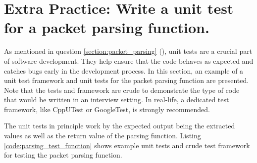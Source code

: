 \documentclass[main.tex]{subfiles}
\begin{document}
\section{Extra Practice: Write a unit test for a packet parsing function.} \label{extra_practice:packet_parsing_tests}

\spoilerline

\noindent As mentioned in question \ref{section:packet_parsing} (\textit{}), unit tests are a crucial part of software development. They help ensure that the code behaves as expected and catches bugs early in the development process. In this section, an example of a unit test framework and unit tests for the packet parsing function are presented. Note that the tests and framework are crude to demonstrate the type of code that would be written in an interview setting. In real-life, a dedicated test framework, like CppUTest or GoogleTest, is strongly recommended. \newline

\newnoindentpara The unit tests in principle work by the expected output being the extracted values as well as the return value of the parsing function. Listing \ref{code:parsing_test_function} shows example unit tests and crude test framework for testing the packet parsing function.


\end{document}
